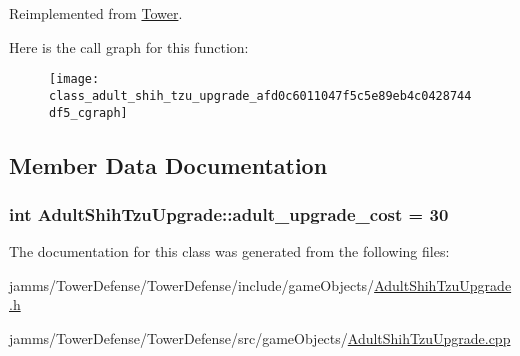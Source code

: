Reimplemented from \hyperlink{class_tower_a2427fab36824f8ec98273cb5e563e0c9}{Tower}.



Here is the call graph for this function\+:\nopagebreak
\begin{figure}[H]
\begin{center}
\leavevmode
\texttt{[image: class\_adult\_shih\_tzu\_upgrade\_afd0c6011047f5c5e89eb4c0428744df5\_cgraph]}
\end{center}
\end{figure}




\subsection{Member Data Documentation}
\hypertarget{class_adult_shih_tzu_upgrade_ac49306d745e7d9e33d8351a7c344a796}{
\subsubsection[{adult\+\_\+upgrade\+\_\+cost}]{\setlength{\rightskip}{0pt plus 5cm}int Adult\+Shih\+Tzu\+Upgrade\+::adult\+\_\+upgrade\+\_\+cost = 30\hspace{0.3cm}{\ttfamily [static]}}}\label{class_adult_shih_tzu_upgrade_ac49306d745e7d9e33d8351a7c344a796}


The documentation for this class was generated from the following files\+:\begin{DoxyCompactItemize}
\item 
jamms/\+Tower\+Defense/\+Tower\+Defense/include/game\+Objects/\hyperlink{_adult_shih_tzu_upgrade_8h}{Adult\+Shih\+Tzu\+Upgrade.\+h}\item 
jamms/\+Tower\+Defense/\+Tower\+Defense/src/game\+Objects/\hyperlink{_adult_shih_tzu_upgrade_8cpp}{Adult\+Shih\+Tzu\+Upgrade.\+cpp}\end{DoxyCompactItemize}
